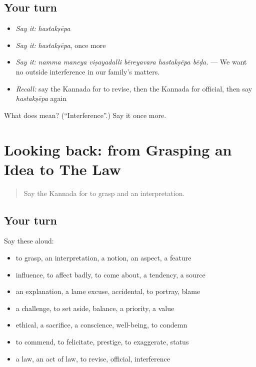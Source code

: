 \subsection*{Your turn}
\begin{itemize}
\raggedright
  \item \emph{Say it:} \emph{hastakṣēpa}
  \item \emph{Say it:} \emph{hastakṣēpa}, once more
  \item \emph{Say it:} \emph{namma maneya viṣayadalli bēreyavara hastakṣēpa bēḍa.} — We want no outside interference in our family's matters.
  \item \emph{Recall:} say the Kannada for to revise, then the Kannada for official, then say \emph{hastakṣēpa} again
\end{itemize}

\begin{tcolorbox}[breakable,colback=teal!4,colframe=teal!35!black,title={Before you move on}]
What does  mean? (\textquotedblleft{}Interference\textquotedblright{}.) Say it once more.
\end{tcolorbox}
\section[(dialogue)]{Looking back: from Grasping an Idea to The Law}

\label{lesson:KA-R390-review-384-390}



\begin{quote}
Say the Kannada for to grasp and an interpretation.
\end{quote}

\subsection*{Your turn}
Say these aloud:

\begin{itemize}
\raggedright
  \item to grasp, an interpretation, a notion, an aspect, a feature
  \item influence, to affect badly, to come about, a tendency, a source
  \item an explanation, a lame excuse, accidental, to portray, blame
  \item a challenge, to set aside, balance, a priority, a value
  \item ethical, a sacrifice, a conscience, well-being, to condemn
  \item to commend, to felicitate, prestige, to exaggerate, status
  \item a law, an act of law, to revise, official, interference
\end{itemize}

